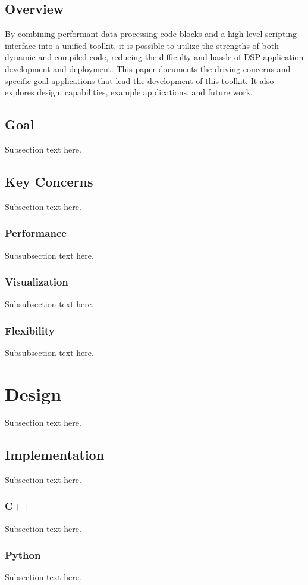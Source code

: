 \documentclass[journal]{IEEEtran}
\begin{document}
\subsection{Overview}
By combining performant data processing code blocks and a high-level scripting interface into a unified toolkit, it 
is possible to utilize the strengths of both dynamic and compiled code, reducing the difficulty and hassle of DSP application 
development and deployment. This paper documents the driving concerns and specific goal applications that lead the development of this toolkit. 
It also explores design, capabilities, example applications, and future work. 

\subsection{Goal}
Subsection text here.

\subsection{Key Concerns}
Subsection text here.
\subsubsection{Performance}
Subsubsection text here.
\subsubsection{Visualization}
Subsubsection text here.
\subsubsection{Flexibility}
Subsubsection text here.

\section{Design}
Subsection text here.

\subsection{Implementation}
Subsection text here.
\subsubsection{C++}
Subsection text here.
\subsubsection{Python}
Subsection text here.
\end{document}
